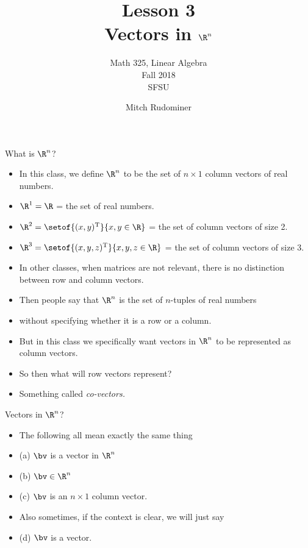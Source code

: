 \documentclass{beamer}
\title{Lesson 3 \\ Vectors in $\R^n$}
\subtitle{Math 325, Linear Algebra \\ Fall 2018 \\ SFSU}
\author{Mitch Rudominer}
\date{}
\begin{document}
\begin{frame}
  \titlepage
\end{frame}

\begin{frame}{What is $\R^n$?}

\begin{itemize}
\item In this class, we define $\R^n$ to be the set of $n\times 1$ column vectors of real numbers.
\item $\R^1=\R$ = the set of real numbers.
\item $\R^2 = \setof{(x,y)^{\text{T}}}{x,y\in\R}$ = the set of column vectors of size 2.
\item $\R^3 = \setof{(x,y,z)^{\text{T}}}{x,y,z\in\R}$ = the set of
column vectors of size 3.
\item In other classes, when matrices are not relevant, there is no distinction between row
and column vectors.
\item Then people say that $\R^n$ is the set of $n$-tuples of real numbers
\item without specifying whether it is a row or a column.
\item But in this class we specifically want vectors in $\R^n$ to be
represented as column vectors.
\item So then what will row vectors represent?
\item Something called \emph{co-vectors.}
\end{itemize}

\end{frame}

\begin{frame}{Vectors in $\R^n$?}

\begin{itemize}
\item The following all mean exactly the same thing
\item (a) $\bv$ is a vector in $\R^n$
\item (b) $\bv \in \R^n$
\item (c) $\bv$ is an $n\times 1$ column vector.
\item Also sometimes, if the context is clear, we will just say
\item (d) $\bv$ is a vector.
\end{itemize}

\end{frame}

\beamerdefaultoverlayspecification{}
\end{document}
